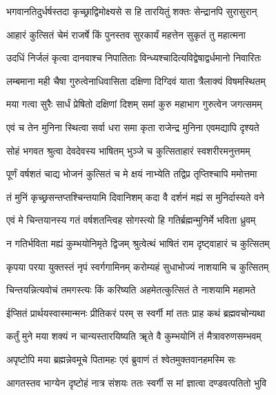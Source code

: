 \twolineshloka
{भगवानतिदुर्धर्षस्तदा कृच्छ्राद्विमोक्ष्यसे}
{स हि तारयितुं शक्तः सेन्द्रानपि सुरासुरान्}%

\twolineshloka
{आहारं कुत्सितं चेमं राजर्षे किं पुनस्तव}
{सुरकार्यं महत्तेन सुकृतं तु महात्मना}%

\twolineshloka
{उदधिं निर्जलं कृत्वा दानवाश्च निपातिताः}
{विन्ध्यश्चादित्यविद्वेषाद्वर्धमानो निवारितः}%

\twolineshloka
{लम्बमाना मही चैषा गुरुत्वेनाधिवासिता}
{दक्षिणा दिग्दिवं याता त्रैलाक्यं विषमस्थितम्}%

\twolineshloka
{मया गत्वा सुरैः सार्धं प्रेषितो दक्षिणां दिशम्}
{समां कुरु महाभाग गुरुत्वेन जगत्समम्}%

\twolineshloka
{एवं च तेन मुनिना स्थित्वा सर्वा धरा समा}
{कृता राजेन्द्र मुनिना एवमद्यापि दृश्यते}%

\twolineshloka
{सोहं भगवत श्रुत्वा देवदेवस्य भाषितम्}
{भुञ्जे च कुत्सिताहारं स्वशरीरमनुत्तमम्}%

\twolineshloka
{पूर्णं वर्षशतं चाद्य भोजनं कुत्सितं च मे}
{क्षयं नाभ्येति तद्विप्र तृप्तिश्चापि ममोत्तमा}%

\twolineshloka
{तं मुनिं कृच्छ्रसन्तप्तश्चिन्तयामि दिवानिशम्}
{कदा वै दर्शनं मह्यं स मुनिर्दास्यते वने}%

\twolineshloka
{एवं मे चिन्तयानस्य गतं वर्षशतन्त्विह}
{सोगस्त्यो हि गतिर्ब्रह्मन्मुनिर्मे भविता ध्रुवम्}%

\twolineshloka
{न गतिर्भविता मह्यं कुम्भयोनिमृते द्विजम्}
{श्रुत्वेत्थं भाषितं राम दृष्ट्वाहारं च कुत्सितम्}%

\twolineshloka
{कृपया परया युक्तस्तं नृपं स्वर्गगामिनम्}
{करोम्यहं सुधाभोज्यं नाशयामि च कुत्सितम्}%

\twolineshloka
{चिन्तयन्नित्यवोचं तमगस्त्यः किं करिष्यति}
{अहमेतत्कुत्सितं ते नाशयामि महामते}%

\twolineshloka
{ईप्सितं प्रार्थयस्वास्मान्मनः प्रीतिकरं परम्}
{स स्वर्गी मां ततः प्राह कथं ब्रह्मवचोन्यथा}%

\twolineshloka
{कर्तुं मुने मया शक्यं न चान्यस्तारयिष्यति}
{ॠते वै कुम्भयोनिं तं मैत्रावरुणसम्भवम्}%

\twolineshloka
{अपृष्टोपि मया ब्रह्मन्नेवमूचे पितामहः}
{एवं ब्रुवाणं तं श्वेतमुक्तवानहमस्मि सः}%

\twolineshloka
{आगतस्तव भाग्येन दृष्टोहं नात्र संशयः}
{ततः स्वर्गी स मां ज्ञात्वा दण्डवत्पतितो भुवि}%


